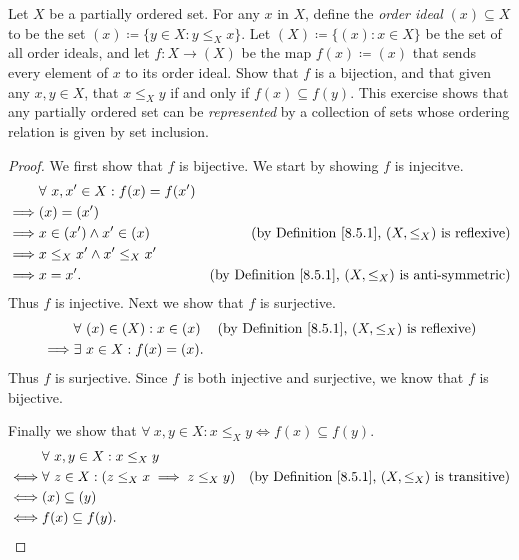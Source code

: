 \begin{exercise}\label{ex 8.5.6}
    Let \(X\) be a partially ordered set.
    For any \(x\) in \(X\), define the \emph{order ideal} \((x) \subseteq X\) to be the set \((x) \coloneqq \{y \in X : y \leq_X x\}\).
    Let \((X) \coloneqq \{(x) : x \in X\}\) be the set of all order ideals, and let \(f : X \to (X)\) be the map \(f(x) \coloneqq (x)\) that sends every element of \(x\) to its order ideal.
    Show that \(f\) is a bijection, and that given any \(x, y \in X\), that \(x \leq_X y\) if and only if \(f(x) \subseteq f(y)\).
    This exercise shows that any partially ordered set can be \emph{represented} by a collection of sets whose ordering relation is given by set inclusion.
\end{exercise}

\begin{proof}
    We first show that \(f\) is bijective.
    We start by showing \(f\) is injecitve.
    \begin{align*}
        & \forall\ x, x' \in X : f(x) = f(x') \\
        \implies & (x) = (x') \\
        \implies & x \in (x') \land x' \in (x) & \text{(by Definition \ref{8.5.1}, \((X, \leq_X)\) is reflexive)} \\
        \implies & x \leq_X x' \land x' \leq_X x' \\
        \implies & x = x'. & \text{(by Definition \ref{8.5.1}, \((X, \leq_X)\) is anti-symmetric)}
    \end{align*}
    Thus \(f\) is injective.
    Next we show that \(f\) is surjective.
    \begin{align*}
        & \forall\ (x) \in (X) : x \in (x) & \text{(by Definition \ref{8.5.1}, \((X, \leq_X)\) is reflexive)} \\
        \implies & \exists\ x \in X : f(x) = (x).
    \end{align*}
    Thus \(f\) is surjective.
    Since \(f\) is both injective and surjective, we know that \(f\) is bijective.

    Finally we show that \(\forall\ x, y \in X : x \leq_X y \iff f(x) \subseteq f(y)\).
    \begin{align*}
        & \forall\ x, y \in X : x \leq_X y \\
        \iff & \forall\ z \in X : (z \leq_X x \implies z \leq_X y) & \text{(by Definition \ref{8.5.1}, \((X, \leq_X)\) is transitive)} \\
        \iff & (x) \subseteq (y) \\
        \iff & f(x) \subseteq f(y).
    \end{align*}
\end{proof}

